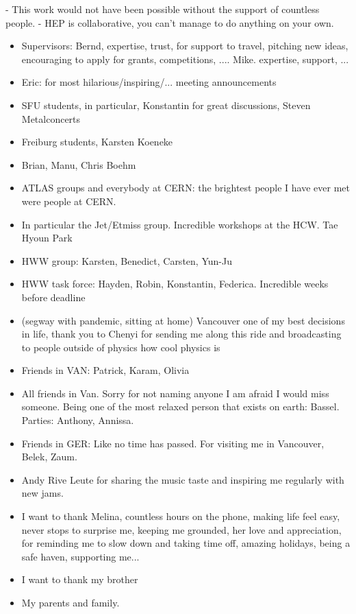 

- This work would not have been possible without the support of countless people.
- HEP is collaborative, you can't manage to do anything on your own.

\begin{itemize}
    \item Supervisors: Bernd, expertise, trust, for support to travel, pitching new ideas, encouraging to apply for grants, competitions, .... Mike. expertise, support, ...
    \item Eric: for most hilarious/inspiring/... meeting announcements
    \item SFU students, in particular, Konstantin for great discussions, Steven Metalconcerts
    \item Freiburg students, Karsten Koeneke
    \item Brian, Manu, Chris Boehm
    \item ATLAS groups and everybody at CERN: the brightest people I have ever met were people at CERN.
    \item In particular the Jet/Etmiss group. Incredible workshops at the HCW. Tae Hyoun Park
    \item HWW group: Karsten, Benedict, Carsten, Yun-Ju
    \item HWW task force: Hayden, Robin, Konstantin, Federica. Incredible weeks before deadline
    \item (segway with pandemic, sitting at home) Vancouver one of my best decisions in life, thank you to Chenyi for sending me along this ride and broadcasting to people outside of physics how cool physics is
    \item Friends in VAN: Patrick, Karam, Olivia
    \item All friends in Van. Sorry for not naming anyone I am afraid I would miss someone. Being one of the most relaxed person that exists on earth: Bassel. Parties: Anthony, Annissa.
    \item Friends in GER: Like no time has passed. For visiting me in Vancouver, Belek, Zaum. 
    \item Andy Rive Leute for sharing the music taste and inspiring me regularly with new jams. 
    \item I want to thank Melina, countless hours on the phone, making life feel easy, never stops to surprise me, keeping me grounded, her love and appreciation, for reminding me to slow down and taking time off, amazing holidays, being a safe haven, supporting me...
    \item I want to thank my brother
    \item My parents and family. 
\end{itemize}

